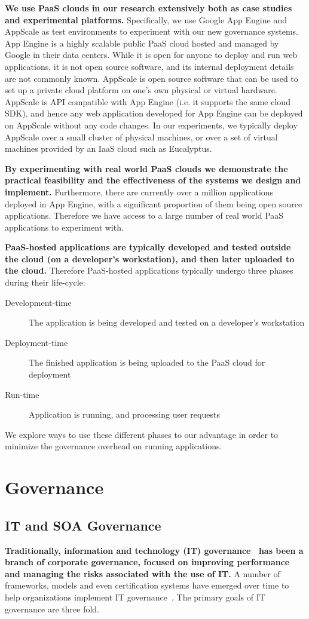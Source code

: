 \textbf{We use PaaS clouds in our research extensively both as case studies
and experimental platforms.} Specifically, we use Google App Engine and AppScale as test environments
to experiment with our new governance systems. App Engine is a highly scalable public PaaS cloud hosted and
managed by Google in their data centers. While it is open for anyone to deploy and run web applications, it is not
open source software, and its internal deployment details are not commonly known. AppScale is open source
software that can be used to set up a private cloud platform on one's own physical or virtual hardware. AppScale
is API compatible with App Engine (i.e. it supports the same cloud SDK), and hence any web application developed
for App Engine can be deployed on AppScale without any code changes. In our experiments, we typically deploy
AppScale over a small cluster of physical machines, or over a set of virtual machines provided by an IaaS cloud
such as Eucalyptus.

\textbf{By experimenting with real world PaaS clouds we demonstrate the practical feasibility and the effectiveness of 
the systems we design and implement.} Furthermore, there are currently over a million applications deployed
in App Engine, with a significant proportion of them being open source applications. Therefore we have access
to a large number of real world PaaS applications to experiment with.

\textbf{PaaS-hosted applications are typically developed and tested outside the cloud (on a developer's workstation), 
and then later uploaded to the cloud.} Therefore PaaS-hosted applications typically undergo three phases 
during their life-cycle:
\begin{description}
\item[Development-time] The application is being developed and tested on a developer's workstation
\item[Deployment-time] The finished application is being uploaded to the PaaS cloud for deployment
\item[Run-time] Application is running, and processing user requests
\end{description}
We explore ways to use these different phases to our advantage in order to minimize the governance
overhead on running applications. 

\section{Governance}
\subsection{IT and SOA Governance}
\textbf{Traditionally, information and technology (IT) governance~\cite{brown2005framing} has been a branch of 
corporate governance, focused on improving performance and managing the risks associated with the use of IT.} 
A number of frameworks, models and even certification systems have emerged over time to help organizations 
implement IT governance~\cite{Ataya:2013:ISR:2523514.2523590,gov-cert}. 
The primary goals of IT governance are three fold.

